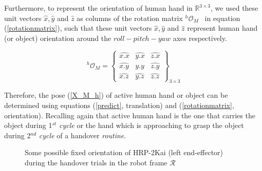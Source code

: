 Furthermore, to represent the orientation of human hand in $\mathbb{R}^{3\times3}$, we used these unit vectors $\hat{x}, \hat{y}$ and $\hat{z}$ as columns of the rotation matrix ${}^{h}\mathcal{O}_{M}$~\cite{evans2001rotations, altmann2005rotations, jia2017rotation} in equation (\ref{rotationmatrix}), such that these unit vectors $\hat{x}, \hat{y}$ and $\hat{z}$ represent human hand (or object) orientation around the $roll-pitch-yaw$ axes respectively.

\begin{equation}\label{rotationmatrix}
{}^{h}\mathcal{O}_{M} = 
\left\{\begin{array}{cccc}
\hat{x.x} & \hat{y.x} & \hat{z.x} \\
\hat{x.y} & \hat{y.y} & \hat{z.y} \\
\hat{x.z} & \hat{y.z} & \hat{z.z}
\end{array}\right\}_{3\times 3}
\end{equation}

Therefore, the pose (\ref{X_M_h}) of active human hand or object can be determined using equations (\ref{predict}, translation) and (\ref{rotationmatrix}, orientation). Recalling again that active human hand is the one that carries the object during 1$^{st}$ \textit{cycle} or the hand which is approaching to grasp the object during 2$^{nd}$ \textit{cycle} of a handover \textit{routine}.

\begin{figure}[htpb]
	\caption{Some possible fixed orientation of HRP-2Kai (left end-effector) during the handover trials in the robot frame $\mathcal{R}$}
	\label{fig:robot_lt_hand_2layers}
\end{figure} 


